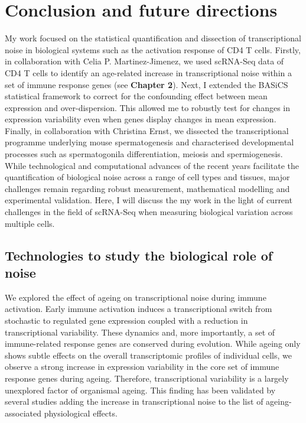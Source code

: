 
\chapter{Conclusion and future directions}  

My work focused on the statistical quantification and dissection of transcriptional noise in biological systems such as the activation response of CD4\plus{} T cells. Firstly, in collaboration with Celia P. Martinez-Jimenez, we used scRNA-Seq data of CD4\plus{} T cells to identify an age-related increase in transcriptional noise within a set of immune response genes (see \textbf{Chapter 2}). Next, I extended the BASiCS statistical framework to correct for the confounding effect between mean expression and over-dispersion. This allowed me to robustly test for changes in expression variability even when genes display changes in mean expression. Finally, in collaboration with Christina Ernst, we dissected the transcriptional programme underlying mouse spermatogenesis and characterised developmental processes such as spermatogonila differentiation, meiosis and spermiogenesis. \\

While technological and computational advances of the recent years facilitate the quantification of biological noise across a range of cell types and tissues, major challenges remain regarding robust measurement, mathematical modelling and experimental validation. Here, I will discuss the my work in the light of current challenges in the field of scRNA-Seq when measuring biological variation across multiple cells.

\newpage

\section{Technologies to study the biological role of noise}

We explored the effect of ageing on transcriptional noise during immune activation. Early immune activation induces a transcriptional switch from stochastic to regulated gene expression coupled with a reduction in transcriptional variability. These dynamics and, more importantly, a set of immune-related response genes are conserved during evolution. While ageing only shows subtle effects on the overall transcriptomic profiles of individual cells, we observe a strong increase in expression variability in the core set of immune response genes during ageing. Therefore, transcriptional variability is a largely unexplored factor of organismal ageing. This finding has been validated by several studies \citep{Enge2017, Angelidis2018, Cheung2018} adding the increase in transcriptional noise to the list of ageing-associated physiological effects.\\

